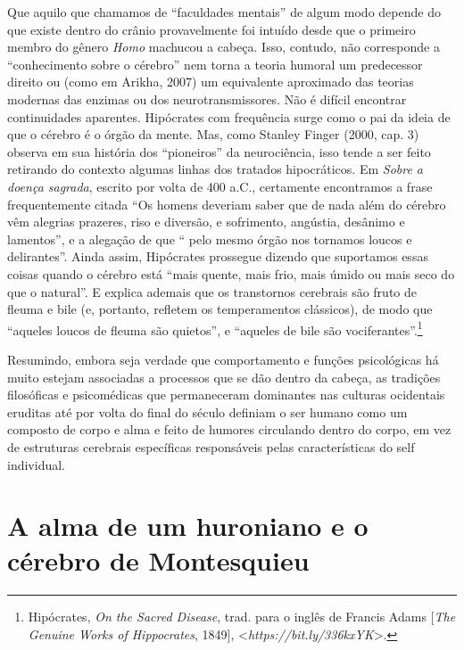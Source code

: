 Que aquilo que chamamos de ``faculdades mentais'' de algum modo depende
do que existe dentro do crânio provavelmente foi intuído desde que o
primeiro membro do gênero \emph{Homo} machucou a cabeça. Isso, contudo,
não corresponde a ``conhecimento sobre o cérebro'' nem torna a teoria
humoral um predecessor direito ou (como em Arikha, 2007) um equivalente
aproximado das teorias modernas das enzimas ou dos neurotransmissores.
Não é difícil encontrar continuidades aparentes. Hipócrates com
frequência surge como o pai da ideia de que o cérebro é o órgão da
mente. Mas, como Stanley Finger (2000, cap. 3) observa em sua história
dos ``pioneiros'' da neurociência, isso tende a ser feito retirando do
contexto algumas linhas dos tratados hipocráticos. Em \emph{Sobre a
doença sagrada}, escrito por volta de 400 a.C., certamente encontramos a
frase frequentemente citada ``Os homens deveriam saber que de nada além
do cérebro vêm alegrias prazeres, riso e diversão, e sofrimento,
angústia, desânimo e lamentos'', e a alegação de que `` pelo mesmo órgão
nos tornamos loucos e delirantes''. Ainda assim, Hipócrates prossegue
dizendo que suportamos essas coisas quando o cérebro está ``mais quente,
mais frio, mais úmido ou mais seco do que o natural''. E explica ademais
que os transtornos cerebrais são fruto de fleuma e bile (e, portanto,
refletem os temperamentos clássicos), de modo que ``aqueles loucos de
fleuma são quietos'', e ``aqueles de bile são
vociferantes''.\footnote[8]{Hipócrates, \emph{On the Sacred Disease}, trad. para o inglês de
Francis Adams {[}\emph{The Genuine Works of Hippocrates}, 1849{]},
\textless{}\emph{https://bit.ly/336kxYK}\textgreater{}.}

Resumindo, embora seja verdade que comportamento e funções psicológicas
há muito estejam associadas a processos que se dão dentro da cabeça, as
tradições filosóficas e psicomédicas que permaneceram dominantes nas
culturas ocidentais eruditas até por volta do final do século 
definiam o ser humano como um composto de corpo e alma e feito de
humores circulando dentro do corpo, em vez de estruturas cerebrais
específicas responsáveis pelas características do self individual.

\chapter{A alma de um huroniano e o cérebro de Montesquieu}

